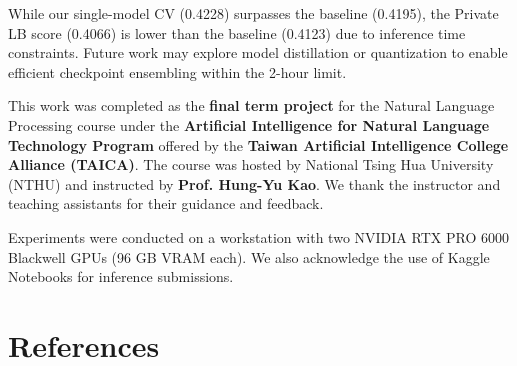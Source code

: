 \documentclass{article}
\begin{document}
While our single-model CV (0.4228) surpasses the baseline (0.4195), the Private LB score (0.4066) is lower than the baseline (0.4123) due to inference time constraints. Future work may explore model distillation or quantization to enable efficient checkpoint ensembling within the 2-hour limit.


\begin{ack}
This work was completed as the \textbf{final term project} for the Natural Language Processing course under the \textbf{Artificial Intelligence for Natural Language Technology Program} offered by the \textbf{Taiwan Artificial Intelligence College Alliance (TAICA)}. The course was hosted by National Tsing Hua University (NTHU) and instructed by \textbf{Prof. Hung-Yu Kao}. We thank the instructor and teaching assistants for their guidance and feedback.

Experiments were conducted on a workstation with two NVIDIA RTX PRO 6000 Blackwell GPUs (96 GB VRAM each). We also acknowledge the use of Kaggle Notebooks for inference submissions.
\end{ack}

\section*{References}
\end{document}
